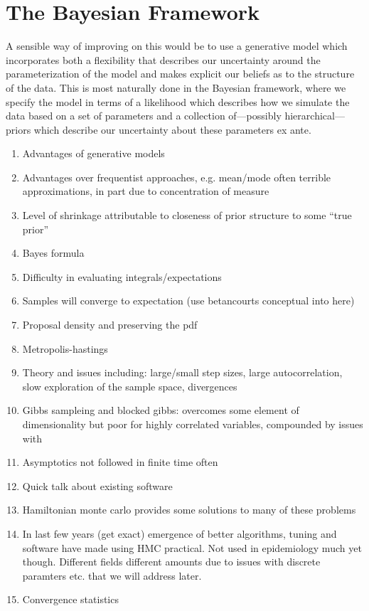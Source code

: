 \documentclass{report}
\begin{document}
\section{The Bayesian Framework}

A sensible way of improving on this would be to use a generative model which incorporates both a flexibility that describes our uncertainty around the parameterization of the model and makes explicit our beliefs as to the structure of the data. This is most naturally done in the Bayesian framework, where we specify the model in terms of a likelihood which describes how we simulate the data based on a set of parameters and a collection of---possibly hierarchical---priors which describe our uncertainty about these parameters ex ante. 

\begin{enumerate}
\item Advantages of generative models
\item Advantages over frequentist approaches, e.g. mean/mode often terrible approximations, in part due to concentration of measure
\item Level of shrinkage attributable to closeness of prior structure to some ``true prior''
\item Bayes formula
\item Difficulty in evaluating integrals/expectations
\item Samples will converge to expectation (use betancourts conceptual into here)
\item Proposal density and preserving the pdf
\item Metropolis-hastings
\item Theory and issues including: large/small step sizes, large autocorrelation, slow exploration of the sample space, divergences
\item Gibbs sampleing and blocked gibbs: overcomes some element of dimensionality but poor for highly correlated variables, compounded by issues with 
\item Asymptotics not followed in finite time often
\item Quick talk about existing software
\item Hamiltonian monte carlo provides some solutions to many of these problems
\item In last few years (get exact) emergence of better algorithms, tuning and software have made using HMC practical. Not used in epidemiology much yet though. Different fields different amounts due to issues with discrete paramters etc. that we will address later.
\item Convergence statistics
\end{enumerate}
\end{document}

